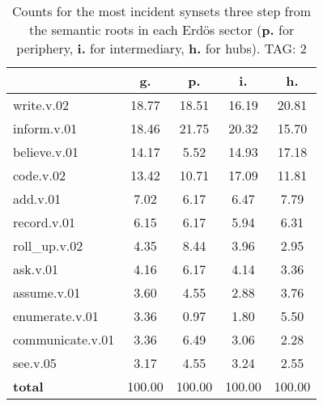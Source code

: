\begin{table}[h!]
\begin{center}
\begin{tabular}{| l || c | c | c | c |}\hline
 & {\bf g.} & {\bf p.} & {\bf i.} & {\bf h.} \\\hline\hline
write.v.02 & 18.77  & 18.51  & 16.19  & 20.81 \\\hline
inform.v.01 & 18.46  & 21.75  & 20.32  & 15.70 \\\hline
believe.v.01 & 14.17  & 5.52  & 14.93  & 17.18 \\\hline
code.v.02 & 13.42  & 10.71  & 17.09  & 11.81 \\\hline
add.v.01 & 7.02  & 6.17  & 6.47  & 7.79 \\\hline
record.v.01 & 6.15  & 6.17  & 5.94  & 6.31 \\\hline
roll\_up.v.02 & 4.35  & 8.44  & 3.96  & 2.95 \\\hline
ask.v.01 & 4.16  & 6.17  & 4.14  & 3.36 \\\hline
assume.v.01 & 3.60  & 4.55  & 2.88  & 3.76 \\\hline
enumerate.v.01 & 3.36  & 0.97  & 1.80  & 5.50 \\\hline
communicate.v.01 & 3.36  & 6.49  & 3.06  & 2.28 \\\hline
see.v.05 & 3.17  & 4.55  & 3.24  & 2.55 \\\hline\hline
{{\bf total}} & 100.00  & 100.00  & 100.00  & 100.00 \\\hline
\end{tabular}
\caption{Counts for the most incident synsets three step from the semantic roots in each Erd\"os sector ({\bf p.} for periphery, {\bf i.} for intermediary, {\bf h.} for hubs). TAG: 2}
\end{center}
\end{table}